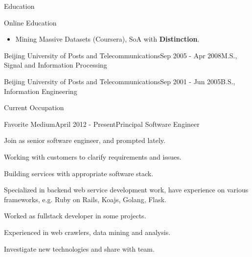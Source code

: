 \documentclass{resume} %
\begin{document}
\begin{rSection}{Education}
\begin{rSubsection}{Online Education}{}{}{}
  \begin{itemize}\vspace{-0.6em}
    \item Mining Massive Datasets (Coursera), SoA with \textbf{Distinction}.
  \end{itemize}
\end{rSubsection}

\begin{rSubsection}{Beijing University of Posts and Telecommunications}{Sep 2005 - Apr 2008}{M.S., Signal and Information Processing}{}
\end{rSubsection}

\begin{rSubsection}{Beijing University of Posts and Telecommunications}{Sep 2001 - Jun 2005}{B.S., Information Engineering}{}
\end{rSubsection}

\end{rSection}



\begin{rSection}{Current Occupation}

\begin{rSubsection}{Favorite Medium}{April 2012 - Present}{Principal Software Engineer}{}{}
\begin{rSubsectionList}
\item Join as senior software engineer, and prompted lately.
\item Working with customers to clarify requirements and issues.
\item Building services with appropriate software stack.
\item Specialized in backend web service development work, have experience on various frameworks, e.g. Ruby on Rails, Koajs, Golang, Flask.
\item Worked as fullstack developer in some projects.
\item Experienced in web crawlers, data mining and analysis.
\item Investigate new technologies and share with team.
\end{rSubsectionList}
\end{rSubsection}
\end{rSection}
\end{document}
